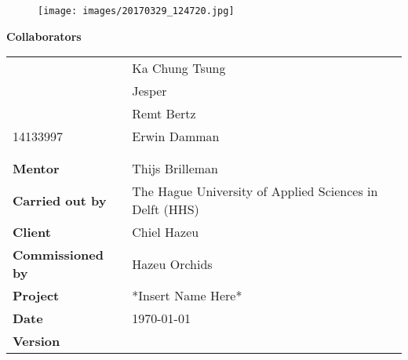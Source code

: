 \begin{titlepage}
		
	\begin{center}
		\LARGE{\textbf{\thistitle}}
	\end{center}
	
	\begin{figure}[h]
		\texttt{[image: images/20170329\_124720.jpg]}
	\end{figure}
	
	\bigskip
	\textbf{Collaborators}
	\begin{table}[h]
		\begin{tabular}{@{}ll@{}}
			                 & Ka Chung Tsung                                          \\
			                 & Jesper                                           \\
			                 & Remt Bertz                                        \\
			14133997                 & Erwin Damman                                            \\
			                         &              										   \\
			                         &              										   \\
			\textbf{Mentor}          & Thijs Brilleman                                         \\
			\textbf{Carried out by}  & The Hague University of Applied Sciences in Delft (HHS) \\
			\textbf{Client}          & Chiel Hazeu                                             \\
			\textbf{Commissioned by} & Hazeu Orchids                                           \\
			\textbf{Project}         & *Insert Name Here*                                      \\
			\textbf{Date}            & \today                                                  \\
			\textbf{Version}         & \version          									   \\
		\end{tabular}
	\end{table}
\end{titlepage}


